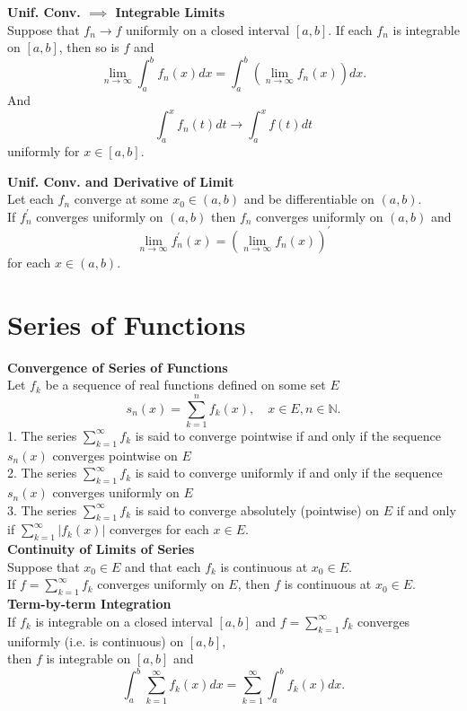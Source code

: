 \documentclass[a4paper, 10pt]{article}
\begin{document}
\begin{multicols*}{3}
\textbf{Unif. Conv. $\implies$ Integrable Limits}\\
Suppose that $f_n \rightarrow f$ uniformly on a closed interval $[a, b]$. 
If each $f_n$ is integrable on $[a, b]$, then so is $f$ and
$$
\lim _{n \rightarrow \infty} \int_a^b f_n(x) d x=\int_a^b\left(\lim _{n \rightarrow \infty} f_n(x)\right) d x .
$$
And 
$$\int_a^x f_n(t) d t\rightarrow\int_a^x f(t) d t$$
uniformly for $x \in[a, b]$.

\textbf{Unif. Conv. and Derivative of Limit}\\
Let each $f_n$ converge at some $x_0 \in(a, b)$ and be differentiable on $(a, b)$.\\ 
If $f_n^{\prime}$ converges uniformly on $(a, b)$ then $f_n$ converges uniformly on $(a, b)$ and
$$
\lim _{n \rightarrow \infty} f_n^{\prime}(x)=\left(\lim _{n \rightarrow \infty} f_n(x)\right)^{\prime}
$$
for each $x \in(a, b)$.

\section*{Series of Functions}

\textbf{Convergence of Series of Functions}\\
Let $f_k$ be a sequence of real functions defined on some set $E$ 
$$
s_n(x)=\sum_{k=1}^n f_k(x), \quad x \in E, n \in \mathbb{N} .
$$
1. The series $\sum_{k=1}^{\infty} f_k$ is said to converge pointwise if and only if the sequence $s_n(x)$ converges pointwise on $E$ \\
2. The series $\sum_{k=1}^{\infty} f_k$ is said to converge uniformly if and only if the sequence $s_n(x)$ converges uniformly on $E$\\ 
3. The series $\sum_{k=1}^{\infty} f_k$ is said to converge absolutely (pointwise) on $E$ if and only if $\sum_{k=1}^{\infty}\left|f_k(x)\right|$ converges for each $x \in E$.\\

\textbf{Continuity of Limits of Series}\\
Suppose that $x_0 \in E$ and that each $f_k$ is continuous at $x_0 \in E$. \\
If $f=\sum_{k=1}^{\infty} f_k$ converges uniformly on $E$, then $f$ is continuous at $x_0 \in E$.\\

\textbf{Term-by-term Integration}\\
If $f_k$ is integrable on a closed interval $[a,b]$ and $f=\sum_{k=1}^{\infty} f_k$ converges uniformly (i.e. is continuous) on $[a, b]$, \\
then $f$ is integrable on $[a, b]$ and
$$
\int_a^b \sum_{k=1}^{\infty} f_k(x) d x=\sum_{k=1}^{\infty} \int_a^b f_k(x) d x .
$$


\end{multicols*}
\end{document}

